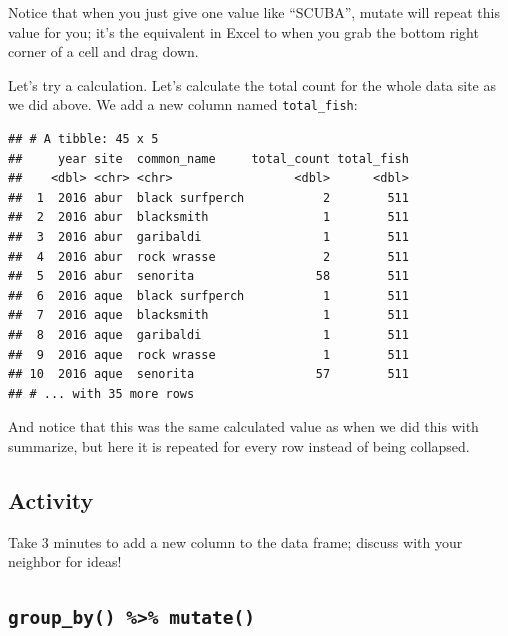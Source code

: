 \documentclass[]{book}
\newenvironment{Shaded}{\begin{snugshade}}{\end{snugshade}}
\newcommand{\DataTypeTok}[1]{\textcolor[rgb]{0.13,0.29,0.53}{#1}}
\newcommand{\KeywordTok}[1]{\textcolor[rgb]{0.13,0.29,0.53}{\textbf{#1}}}
\newcommand{\NormalTok}[1]{#1}
\newcommand{\OperatorTok}[1]{\textcolor[rgb]{0.81,0.36,0.00}{\textbf{#1}}}
\newcommand{\StringTok}[1]{\textcolor[rgb]{0.31,0.60,0.02}{#1}}
\begin{document}
Notice that when you just give one value like ``SCUBA'', mutate will repeat this value for you; it's the equivalent in Excel to when you grab the bottom right corner of a cell and drag down.

Let's try a calculation. Let's calculate the total count for the whole data site as we did above. We add a new column named \texttt{total\_fish}:

\begin{Shaded}
\end{Shaded}

\begin{verbatim}
## # A tibble: 45 x 5
##     year site  common_name     total_count total_fish
##    <dbl> <chr> <chr>                 <dbl>      <dbl>
##  1  2016 abur  black surfperch           2        511
##  2  2016 abur  blacksmith                1        511
##  3  2016 abur  garibaldi                 1        511
##  4  2016 abur  rock wrasse               2        511
##  5  2016 abur  senorita                 58        511
##  6  2016 aque  black surfperch           1        511
##  7  2016 aque  blacksmith                1        511
##  8  2016 aque  garibaldi                 1        511
##  9  2016 aque  rock wrasse               1        511
## 10  2016 aque  senorita                 57        511
## # ... with 35 more rows
\end{verbatim}

And notice that this was the same calculated value as when we did this with summarize, but here it is repeated for every row instead of being collapsed.

\hypertarget{activity-5}{%
\subsection{Activity}\label{activity-5}}

Take 3 minutes to add a new column to the data frame; discuss with your neighbor for ideas!

\hypertarget{group_by-mutate}{%
\subsection{\texorpdfstring{\texttt{group\_by()\ \%\textgreater{}\%\ mutate()}}{group\_by() \%\textgreater{}\% mutate()}}\label{group_by-mutate}}
\end{document}
